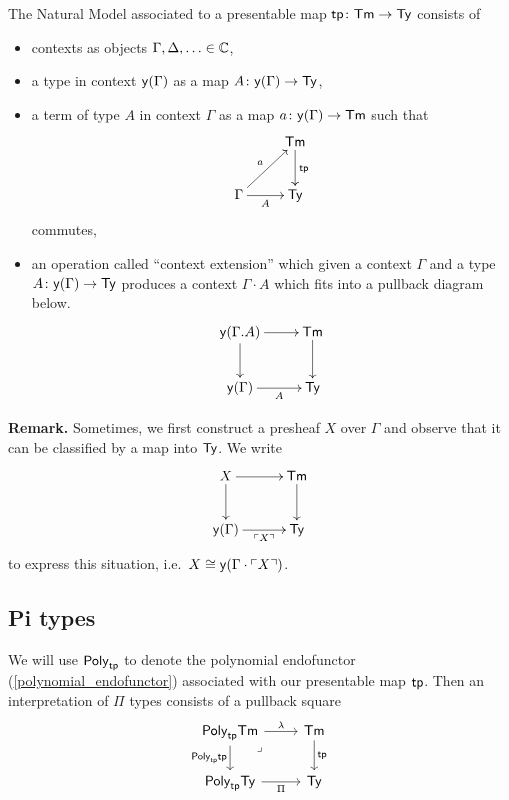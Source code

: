 \medskip

The Natural Model associated to a presentable map $\mathsf{tp} \colon \mathsf{Tm} \to \mathsf{Ty}$ consists of
\begin{itemize}
\item contexts as objects $\Gamma, \Delta, \ldots \in \mathbb{C}$,
\item a type in context $\mathsf{y} (\Gamma)$ as a map $A \colon \mathsf{y}(\Gamma) \to \mathsf{Ty}$,
\item a term of type $A$ in context $\Gamma$ as a map $a \colon \mathsf{y}(\Gamma) \to \mathsf{Tm}$ such that
\[
\xymatrix{
 & \Term \ar[d]^{\tp} \\
\Gamma \ar[r]_-A \ar[ur]^{a} & \Type}
\]
commutes,
\item an operation called ``context extension'' which given a context $\Gamma$ and a type $A \colon \mathsf{y}(\Gamma) \to \mathsf{Ty}$ produces a context $\Gamma\cdot A$ which fits into a pullback diagram below.
\[
\xymatrix{
\yo(\Gamma.A) \ar[r] \ar[d] & \Term \ar[d] \\
\yo(\Gamma) \ar[r]_-{A} & \Type}
\]
\end{itemize}





{\bf Remark.}
Sometimes, we first construct a presheaf $X$ over $\Gamma$ and observe that it can be classified by a map into $\mathsf{Ty}$. We write
\[
\xymatrix@C=1cm{
X \ar[r] \ar[d]& \Term \ar[d] \\
\yo(\Gamma) \ar[r]_-{\ulcorner X \urcorner} & \Type}
\]
to express this situation, i.e.~$X \cong \mathsf{y}(\Gamma \cdot \ulcorner X \urcorner)$.

\medskip

\subsection{Pi types}

We will use $\mathsf{Poly}_{\mathsf{tp}}$ to denote the polynomial endofunctor
(\cref{polynomial_endofunctor}) associated with our presentable map $\mathsf{tp}$.
Then an interpretation of $\Pi$ types consists of a pullback square
\[\begin{tikzcd}
	{\Poly{\tp}{\Term}} & \Term \\
	{\Poly{\tp}{\Type}} & \Type
	\arrow["\la", from=1-1, to=1-2]
	\arrow["{\Poly{\tp}{\tp}}"', from=1-1, to=2-1]
	\arrow["\lrcorner"{anchor=center, pos=0.125}, draw=none, from=1-1, to=2-2]
	\arrow["\tp", from=1-2, to=2-2]
	\arrow["\Pi"', from=2-1, to=2-2]
\end{tikzcd}\]

